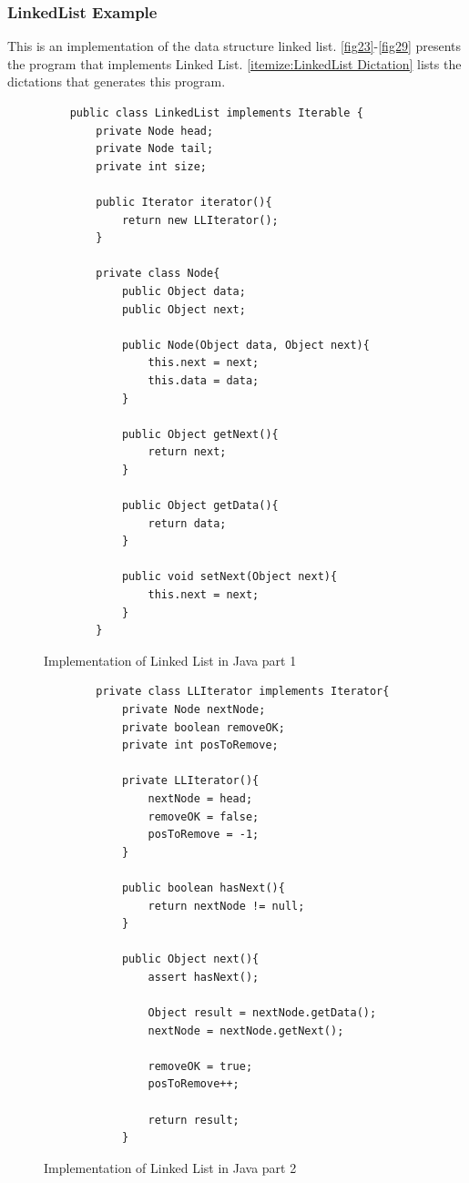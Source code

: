 \subsubsection{LinkedList Example}
This is an implementation of the data structure linked list. \autoref{fig23}-\autoref{fig29} presents the program that implements Linked List. \autoref{itemize:LinkedList Dictation} lists the dictations that generates this program.
\begin{figure}[H]
	\begin{lstlisting}
	public class LinkedList implements Iterable {
	    private Node head;
	    private Node tail;
	    private int size;
	    
	    public Iterator iterator(){
	        return new LLIterator();
	    }
	    
		private class Node{
			public Object data;
			public Object next;
			
			public Node(Object data, Object next){
				this.next = next;
				this.data = data;
			}
			
			public Object getNext(){
				return next;
			}
			
			public Object getData(){
				return data;
			}
			
			public void setNext(Object next){
				this.next = next;
			}
		}
	\end{lstlisting}
	\caption{Implementation of Linked List in Java part 1}
	\label{fig23}
\end{figure}
\begin{figure}[H]
	\begin{lstlisting}
	    private class LLIterator implements Iterator{
	        private Node nextNode;
	        private boolean removeOK;
	        private int posToRemove;
	        
	        private LLIterator(){
	            nextNode = head;
	            removeOK = false;
	            posToRemove = -1;
	        }
	        
	        public boolean hasNext(){
	            return nextNode != null;
	        }
	        
	        public Object next(){
	            assert hasNext();
	            
	            Object result = nextNode.getData();
	            nextNode = nextNode.getNext();
	            
	            removeOK = true;
	            posToRemove++;
	            
	            return result;
	        }
	\end{lstlisting}
	\caption{Implementation of Linked List in Java part 2}
	\label{fig24}
\end{figure}
